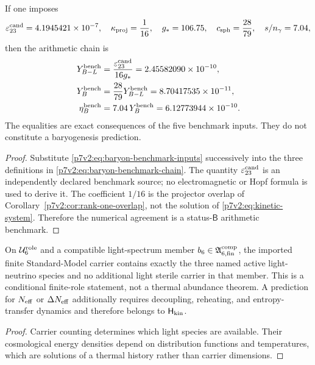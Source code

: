 \documentclass[12pt,a4paper]{article}
\newcommand{\Hkin}{\mathsf{H}_{\rm kin}}
\newcommand{\Urole}{\mathcal U_6^{\rm role}}
\newcommand{\Acompsix}{\mathfrak A_{6,{\rm fin}}^{\rm comp}}
\begin{document}
\begin{proposition}
\label{p7v2:prop:baryon-benchmark}
If one imposes
\begin{equation}
\label{p7v2:eq:baryon-benchmark-inputs}
 \varepsilon_{23}^{\rm cand}=4.1945421\times10^{-7},
 \quad
 \kappa_{\rm proj}=\frac1{16},
 \quad
 g_*=106.75,
 \quad
 c_{\rm sph}=\frac{28}{79},
 \quad
 s/n_\gamma=7.04,
\end{equation}
then the arithmetic chain is
\begin{align}
\label{p7v2:eq:baryon-benchmark-chain}
 Y_{B-L}^{\rm bench}
 &=
 \frac{\varepsilon_{23}^{\rm cand}}{16g_*}
 =2.45582090\times10^{-10},\\
 Y_B^{\rm bench}
 &=
 \frac{28}{79}Y_{B-L}^{\rm bench}
 =8.70417535\times10^{-11},\\
 \eta_B^{\rm bench}
 &=
 7.04\,Y_B^{\rm bench}
 =6.12773944\times10^{-10}.
\end{align}
The equalities are exact consequences of the five benchmark inputs.  They do
not constitute a baryogenesis prediction.
\end{proposition}

\begin{proof}
Substitute \eqref{p7v2:eq:baryon-benchmark-inputs} successively into the three
definitions in \eqref{p7v2:eq:baryon-benchmark-chain}.  The quantity
\(\varepsilon_{23}^{\rm cand}\) is an independently declared benchmark source;
no electromagnetic or Hopf formula is used to derive it.  The coefficient
\(1/16\) is the projector overlap of
Corollary~\ref{p7v2:cor:rank-one-overlap}, not the solution of
\eqref{p7v2:eq:kinetic-system}.  Therefore the numerical agreement is a
status-\(\mathsf B\) arithmetic benchmark.
\end{proof}

\begin{proposition}
\label{p7v2:prop:dark-radiation-boundary}
On \(\Urole\) and a compatible light-spectrum member
\(b_6\in\Acompsix\), the imported finite Standard-Model carrier contains
exactly the three named active light-neutrino species and no additional light
sterile carrier in that member.  This is a conditional finite-role statement,
not a thermal abundance theorem.  A prediction for \(N_{\rm eff}\) or
\(\Delta N_{\rm eff}\) additionally requires decoupling, reheating, and
entropy-transfer dynamics and therefore belongs to \(\Hkin\).
\end{proposition}

\begin{proof}
Carrier counting determines which light species are available.  Their
cosmological energy densities depend on distribution functions and
temperatures, which are solutions of a thermal history rather than carrier
dimensions.
\end{proof}
\end{document}
